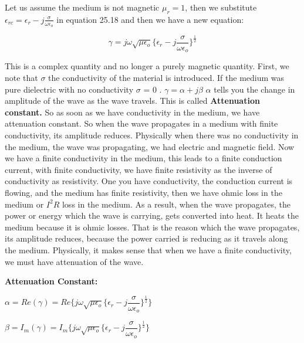 Let us assume the medium is not magnetic $\mu_{r} = 1$, then we substitute $\epsilon_{rc} = \epsilon_{r} -j \frac{\sigma}{\omega\epsilon_{o}}$ in equation 25.18 and then we have a new equation:

\begin{equation}
\gamma = j\omega\sqrt{\mu\epsilon_{o}}\Bigg\{\epsilon_{r} - j \dfrac{\sigma}{\omega\epsilon_{o}}\Bigg\}^{\frac{1}{2}}
\end{equation}

This is a complex quantity and no longer a purely magnetic quantity. First, we note that $\sigma$ the conductivity of the material is introduced. If the medium was pure dielectric with no conductivity $\sigma$ = 0 . $\gamma = \alpha + j\beta$ $\alpha$ tells you the change in amplitude of the wave as the wave travels. This is called \textbf{Attenuation constant.} So as soon as we have conductivity in the medium, we have attenuation constant. So when the wave propagates in a medium with finite conductivity, its amplitude reduces. Physically when there was no conductivity in the medium, the wave was propagating, we had electric and magnetic field. Now we have a finite conductivity in the medium, this leads to a finite conduction current, with finite conductivity, we have finite resistivity as the inverse of conductivity as resistivity. One you have conductivity, the conduction current is flowing, and the medium has finite resistivity, then we have ohmic loss in the medium or $I^2 R$ loss in the medium. As a result, when the wave propagates, the power or energy which the wave is carrying, gets converted into heat. It heats the medium because it is ohmic losses. That is the reason which the wave propagates, its amplitude reduces, because the power carried is reducing as it travels along the medium. Physically, it makes sense that when we have a finite conductivity, we must have attenuation of the wave. 

\textbf{Attenuation Constant:}
\begin{center}
$\alpha = Re(\gamma) = Re\Bigg\{j\omega\sqrt{\mu\epsilon_{o}}\bigg\{\epsilon_{r} - j\dfrac{\sigma}{\omega\epsilon_{o}}\bigg\}^{\frac{1}{2}}\Bigg\}$
\end{center}

\begin{center}
	$\beta = I_{m}(\gamma) = I_{m}\Bigg\{j\omega\sqrt{\mu\epsilon_{o}}\bigg\{\epsilon_{r} - j\dfrac{\sigma}{\omega\epsilon_{o}}\bigg\}^{\frac{1}{2}}\Bigg\}$
\end{center}

